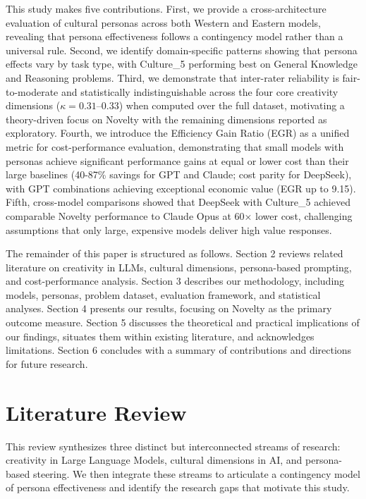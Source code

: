 \documentclass{article}
\begin{document}
This study makes five contributions. First, we provide a cross-architecture evaluation of cultural personas across both Western and Eastern models, revealing that persona effectiveness follows a contingency model rather than a universal rule. Second, we identify domain-specific patterns showing that persona effects vary by task type, with Culture\_5 performing best on General Knowledge and Reasoning problems. Third, we demonstrate that inter-rater reliability is fair-to-moderate and statistically indistinguishable across the four core creativity dimensions (\(\kappa = 0.31\)--\(0.33\)) when computed over the full dataset, motivating a theory-driven focus on Novelty with the remaining dimensions reported as exploratory. Fourth, we introduce the Efficiency Gain Ratio (EGR) as a unified metric for cost-performance evaluation, demonstrating that small models with personas achieve significant performance gains at equal or lower cost than their large baselines (40-87\% savings for GPT and Claude; cost parity for DeepSeek), with GPT combinations achieving exceptional economic value (EGR up to 9.15). Fifth, cross-model comparisons showed that DeepSeek with Culture\_5 achieved comparable Novelty performance to Claude Opus at 60× lower cost, challenging assumptions that only large, expensive models deliver high value responses.

The remainder of this paper is structured as follows. Section 2 reviews related literature on creativity in LLMs, cultural dimensions, persona-based prompting, and cost-performance analysis. Section 3 describes our methodology, including models, personas, problem dataset, evaluation framework, and statistical analyses. Section 4 presents our results, focusing on Novelty as the primary outcome measure. Section 5 discusses the theoretical and practical implications of our findings, situates them within existing literature, and acknowledges limitations. Section 6 concludes with a summary of contributions and directions for future research.

\section{Literature Review}

This review synthesizes three distinct but interconnected streams of research: creativity in Large Language Models, cultural dimensions in AI, and persona-based steering. We then integrate these streams to articulate a contingency model of persona effectiveness and identify the research gaps that motivate this study.
\end{document}
